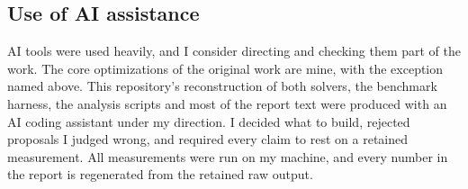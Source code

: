 \subsection{Use of AI assistance}
AI tools were used heavily, and I consider directing and checking them part of the work. The core optimizations of the original work are mine, with the exception named above. This repository's reconstruction of both solvers, the benchmark harness, the analysis scripts and most of the report text were produced with an AI coding assistant under my direction. I decided what to build, rejected proposals I judged wrong, and required every claim to rest on a retained measurement. All measurements were run on my machine, and every number in the report is regenerated from the retained raw output.
